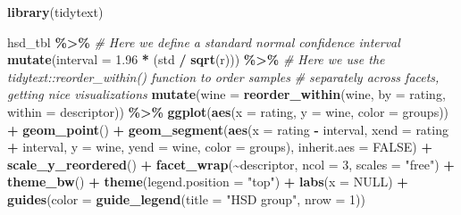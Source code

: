 \documentclass[
]{book}
\newenvironment{Shaded}{\begin{snugshade}}{\end{snugshade}}
\newcommand{\AttributeTok}[1]{\textcolor[rgb]{0.13,0.29,0.53}{#1}}
\newcommand{\CommentTok}[1]{\textcolor[rgb]{0.56,0.35,0.01}{\textit{#1}}}
\newcommand{\ConstantTok}[1]{\textcolor[rgb]{0.56,0.35,0.01}{#1}}
\newcommand{\DecValTok}[1]{\textcolor[rgb]{0.00,0.00,0.81}{#1}}
\newcommand{\FloatTok}[1]{\textcolor[rgb]{0.00,0.00,0.81}{#1}}
\newcommand{\FunctionTok}[1]{\textcolor[rgb]{0.13,0.29,0.53}{\textbf{#1}}}
\newcommand{\NormalTok}[1]{#1}
\newcommand{\SpecialCharTok}[1]{\textcolor[rgb]{0.81,0.36,0.00}{\textbf{#1}}}
\newcommand{\StringTok}[1]{\textcolor[rgb]{0.31,0.60,0.02}{#1}}
\begin{document}
\begin{Shaded}
\begin{Highlighting}[]
\FunctionTok{library}\NormalTok{(tidytext)}

\NormalTok{hsd\_tbl }\SpecialCharTok{\%\textgreater{}\%}
  \CommentTok{\# Here we define a standard normal confidence interval}
  \FunctionTok{mutate}\NormalTok{(}\AttributeTok{interval =} \FloatTok{1.96} \SpecialCharTok{*}\NormalTok{ (std }\SpecialCharTok{/} \FunctionTok{sqrt}\NormalTok{(r))) }\SpecialCharTok{\%\textgreater{}\%}
  \CommentTok{\# Here we use the tidytext::reorder\_within() function to order samples}
  \CommentTok{\# separately across facets, getting nice visualizations}
  \FunctionTok{mutate}\NormalTok{(}\AttributeTok{wine =} \FunctionTok{reorder\_within}\NormalTok{(wine, }\AttributeTok{by =}\NormalTok{ rating, }\AttributeTok{within =}\NormalTok{ descriptor)) }\SpecialCharTok{\%\textgreater{}\%}
  \FunctionTok{ggplot}\NormalTok{(}\FunctionTok{aes}\NormalTok{(}\AttributeTok{x =}\NormalTok{ rating, }\AttributeTok{y =}\NormalTok{ wine, }\AttributeTok{color =}\NormalTok{ groups)) }\SpecialCharTok{+} 
  \FunctionTok{geom\_point}\NormalTok{() }\SpecialCharTok{+} 
  \FunctionTok{geom\_segment}\NormalTok{(}\FunctionTok{aes}\NormalTok{(}\AttributeTok{x =}\NormalTok{ rating }\SpecialCharTok{{-}}\NormalTok{ interval, }
                   \AttributeTok{xend =}\NormalTok{ rating }\SpecialCharTok{+}\NormalTok{ interval, }
                   \AttributeTok{y =}\NormalTok{ wine, }\AttributeTok{yend =}\NormalTok{ wine, }
                   \AttributeTok{color =}\NormalTok{ groups), }
               \AttributeTok{inherit.aes =} \ConstantTok{FALSE}\NormalTok{) }\SpecialCharTok{+} 
  \FunctionTok{scale\_y\_reordered}\NormalTok{() }\SpecialCharTok{+}
  \FunctionTok{facet\_wrap}\NormalTok{(}\SpecialCharTok{\textasciitilde{}}\NormalTok{descriptor, }\AttributeTok{ncol =} \DecValTok{3}\NormalTok{, }\AttributeTok{scales =} \StringTok{"free"}\NormalTok{) }\SpecialCharTok{+} 
  \FunctionTok{theme\_bw}\NormalTok{() }\SpecialCharTok{+}
  \FunctionTok{theme}\NormalTok{(}\AttributeTok{legend.position =} \StringTok{"top"}\NormalTok{) }\SpecialCharTok{+} 
  \FunctionTok{labs}\NormalTok{(}\AttributeTok{x =} \ConstantTok{NULL}\NormalTok{) }\SpecialCharTok{+} 
  \FunctionTok{guides}\NormalTok{(}\AttributeTok{color =} \FunctionTok{guide\_legend}\NormalTok{(}\AttributeTok{title =} \StringTok{"HSD group"}\NormalTok{, }\AttributeTok{nrow =} \DecValTok{1}\NormalTok{))}
\end{Highlighting}
\end{Shaded}
\end{document}
